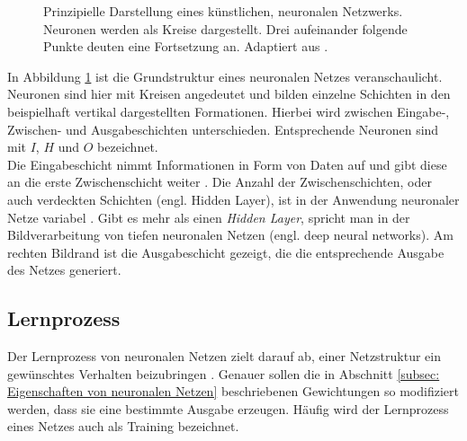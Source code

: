 \begin{figure}[H]
				\caption{Prinzipielle Darstellung eines künstlichen, neuronalen Netzwerks. Neuronen werden als Kreise dargestellt. Drei aufeinander folgende Punkte deuten eine Fortsetzung an. Adaptiert aus \cite{neuron}.}
				\label{fig: neuronales netz }
		\end{figure}
	
		
		In Abbildung \ref{fig: neuronales netz } ist die Grundstruktur eines neuronalen Netzes veranschaulicht. Neuronen sind hier mit Kreisen angedeutet und bilden einzelne Schichten in den beispielhaft vertikal dargestellten Formationen. Hierbei wird zwischen Eingabe-, Zwischen- und Ausgabeschichten unterschieden. Entsprechende Neuronen sind mit $I$, $H$ und $O$ bezeichnet.\\
		
		Die Eingabeschicht nimmt Informationen in Form von Daten auf und gibt diese an die erste Zwischenschicht weiter \cite{deeplearning}. Die Anzahl der Zwischenschichten, oder auch verdeckten Schichten (engl. Hidden Layer), ist in der Anwendung neuronaler Netze variabel \cite{deeplearning}. Gibt es mehr als einen \textit{Hidden Layer}, spricht man in der Bildverarbeitung von tiefen neuronalen Netzen (engl. deep neural networks). Am rechten Bildrand ist die Ausgabeschicht gezeigt, die die entsprechende Ausgabe des Netzes generiert.  \newpage
	
		\subsection{Lernprozess}
		Der Lernprozess von neuronalen Netzen zielt darauf ab, einer Netzstruktur ein gewünschtes Verhalten beizubringen \cite{proba}. Genauer sollen die in Abschnitt \ref{subsec: Eigenschaften von neuronalen Netzen} beschriebenen Gewichtungen so modifiziert werden, dass sie eine bestimmte Ausgabe erzeugen. Häufig wird der Lernprozess eines Netzes auch als Training bezeichnet.\\
		
